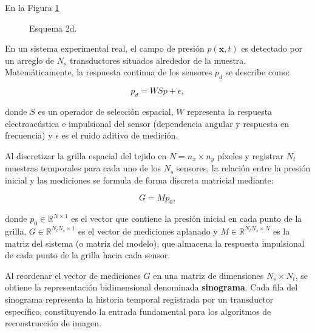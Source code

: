 En la Figura \ref{fig:TOA_2D_lab}

\begin{figure}[H]
    \centering
    \resizebox{0.55\textwidth}{!}{%
    }%
    \caption{Esquema 2d.}
    \label{fig:TOA_2D_lab}
\end{figure}

En un sistema experimental real, el campo de presión $p(\mathbf{x}, t)$ es detectado por un arreglo de $N_s$ transductores situados alrededor de la muestra. Matemáticamente, la respuesta continua de los sensores $p_d$ se describe como:

\begin{equation}
    p_d = W S p + \epsilon,
    \label{eq:modelo_sensor_continuo}
\end{equation}

donde $S$ es un operador de selección espacial, $W$ representa la respuesta electroacústica e impulsional del sensor (dependencia angular y respuesta en frecuencia) y $\epsilon$ es el ruido aditivo de medición.

Al discretizar la grilla espacial del tejido en $N = n_x \times n_y$ píxeles y registrar $N_t$ muestras temporales para cada uno de los $N_s$ sensores, la relación entre la presión inicial y las mediciones se formula de forma discreta matricial mediante:

\begin{equation}
    G = M p_0,
    \label{eq:modelo_discreto_matricial}
\end{equation}

donde $p_0 \in \mathbb{R}^{N \times 1}$ es el vector que contiene la presión inicial en cada punto de la grilla, $G \in \mathbb{R}^{N_t N_s \times 1}$ es el vector de mediciones aplanado y $M \in \mathbb{R}^{N_t N_s \times N}$ es la matriz del sistema (o matriz del modelo), que almacena la respuesta impulsional de cada punto de la grilla hacia cada sensor.

Al reordenar el vector de mediciones $G$ en una matriz de dimensiones $N_s \times N_t$, se obtiene la representación bidimensional denominada \textbf{sinograma}. Cada fila del sinograma representa la historia temporal registrada por un transductor específico, constituyendo la entrada fundamental para los algoritmos de reconstrucción de imagen.




